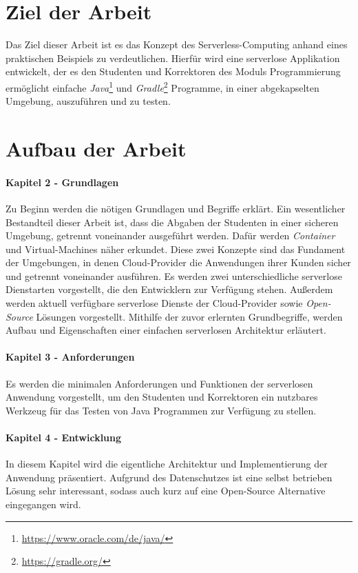 \section{Ziel der Arbeit}
Das Ziel dieser Arbeit ist es das Konzept des Serverless-Computing anhand eines praktischen
Beispiels zu verdeutlichen. Hierfür wird eine serverlose Applikation entwickelt,
der es den Studenten und Korrektoren des Moduls
Programmierung ermöglicht einfache
\textit{Java}\footnote{\url{https://www.oracle.com/de/java/}}
und \textit{Gradle}\footnote{\url{https://gradle.org/}} Programme, in einer
abgekapselten Umgebung, auszuführen und zu testen.

\section{Aufbau der Arbeit}
\paragraph{Kapitel 2 - Grundlagen} Zu Beginn werden die nötigen Grundlagen und Begriffe erklärt.
Ein wesentlicher Bestandteil dieser Arbeit ist, dass die Abgaben der Studenten in einer sicheren Umgebung,
getrennt voneinander ausgeführt werden. Dafür werden
\textit{Container} und Virtual-Machines 
näher erkundet. Diese zwei Konzepte sind das Fundament der Umgebungen, in denen Cloud-Provider die 
Anwendungen ihrer Kunden sicher und getrennt voneinander ausführen.
Es werden zwei unterschiedliche serverlose Dienstarten vorgestellt, die den Entwicklern zur Verfügung stehen.
Außerdem werden aktuell verfügbare serverlose Dienste der Cloud-Provider sowie \textit{Open-Source} 
Lösungen vorgestellt. Mithilfe der zuvor erlernten Grundbegriffe, werden Aufbau und 
Eigenschaften einer einfachen serverlosen Architektur erläutert.

\paragraph{Kapitel 3 - Anforderungen} Es werden die minimalen Anforderungen und Funktionen
der serverlosen Anwendung vorgestellt, um den Studenten und Korrektoren ein nutzbares Werkzeug
für das Testen von Java Programmen zur Verfügung zu stellen.

\paragraph{Kapitel 4 - Entwicklung} In diesem Kapitel wird die eigentliche Architektur
und Implementierung der Anwendung präsentiert. Aufgrund des Datenschutzes ist eine
selbst betrieben Lösung sehr interessant, sodass auch kurz auf eine Open-Source Alternative eingegangen wird.

